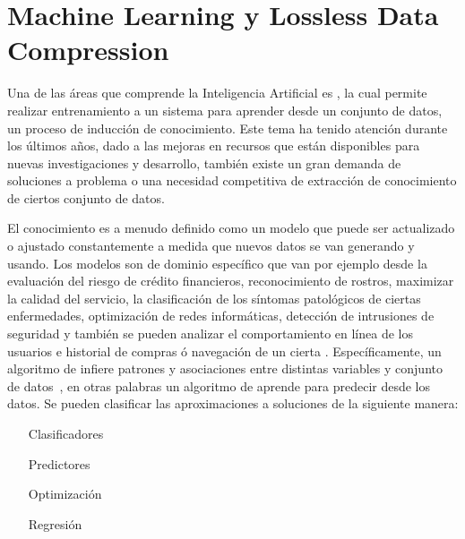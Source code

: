 \chapter[Machine Learning y Lossless Data Compression]{Machine Learning y Lossless Data Compression}\label{ch:Compresion-Machine-Learning}


Una de las áreas que comprende la Inteligencia Artificial es \machinelearning, la cual permite realizar entrenamiento a un sistema para aprender desde un conjunto de datos, un proceso de inducción de conocimiento. Este tema ha tenido atención durante los últimos años, dado a las mejoras en recursos \cloudcomputing que están disponibles para nuevas investigaciones y desarrollo, también existe un gran demanda de soluciones a problema o una necesidad competitiva de extracción de conocimiento de ciertos conjunto de datos.

El conocimiento es a menudo definido como un modelo que puede ser actualizado o ajustado constantemente a medida que nuevos datos se van generando y usando. Los modelos son  de dominio específico que van por ejemplo desde la evaluación del riesgo de crédito financieros, reconocimiento de rostros, maximizar la calidad del servicio, la clasificación de los síntomas patológicos de ciertas enfermedades, optimización de redes informáticas, detección de intrusiones de seguridad y también se pueden analizar el comportamiento en línea de los usuarios e historial de compras ó navegación  de un cierta \webs. Específicamente, un algoritmo de \machinelearning infiere patrones y asociaciones entre distintas variables y conjunto de datos~\cite{guller2015big}, en otras palabras un algoritmo de \machinelearning aprende para predecir desde los datos. Se pueden clasificar las aproximaciones a soluciones de la siguiente manera:

\begin{itemize}
	
	\item[Clasificadores]	
		

	\item[Predictores]		
		

	\item[Optimización]	
		

	\item[Regresión]
		

\end{itemize}

